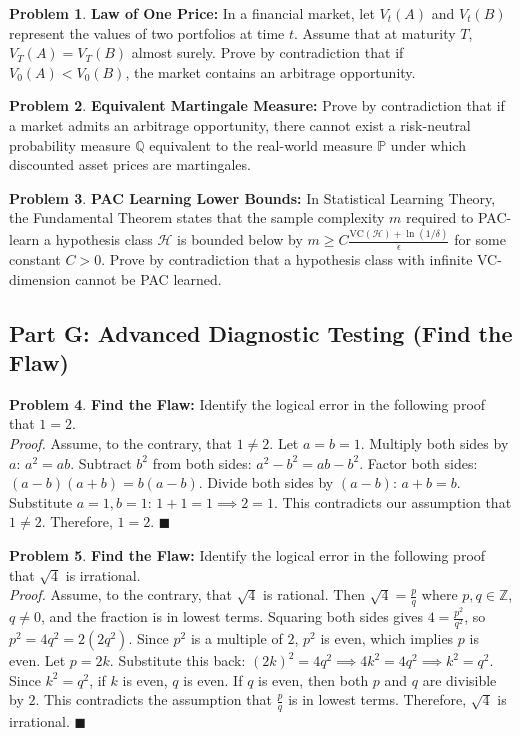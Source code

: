 \documentclass[11pt]{article}
\theoremstyle{definition}
\newtheorem{problem}{Problem}
\begin{document}
\begin{problem}
\textbf{Law of One Price:} In a financial market, let $V_t(A)$ and $V_t(B)$ represent the values of two portfolios at time $t$. Assume that at maturity $T$, $V_T(A) = V_T(B)$ almost surely. Prove by contradiction that if $V_0(A) < V_0(B)$, the market contains an arbitrage opportunity.
\end{problem}

\begin{problem}
\textbf{Equivalent Martingale Measure:} Prove by contradiction that if a market admits an arbitrage opportunity, there cannot exist a risk-neutral probability measure $\mathbb{Q}$ equivalent to the real-world measure $\mathbb{P}$ under which discounted asset prices are martingales.
\end{problem}

\begin{problem}
\textbf{PAC Learning Lower Bounds:} In Statistical Learning Theory, the Fundamental Theorem states that the sample complexity $m$ required to PAC-learn a hypothesis class $\mathcal{H}$ is bounded below by $m \ge C \frac{\text{VC}(\mathcal{H}) + \ln(1/\delta)}{\epsilon}$ for some constant $C > 0$. Prove by contradiction that a hypothesis class with infinite VC-dimension cannot be PAC learned.
\end{problem}

\subsection{Part G: Advanced Diagnostic Testing (Find the Flaw)}

\begin{problem}
\textbf{Find the Flaw:} Identify the logical error in the following proof that $1 = 2$. \\
\textit{Proof.} Assume, to the contrary, that $1 \neq 2$. Let $a = b = 1$. Multiply both sides by $a$: $a^2 = ab$. Subtract $b^2$ from both sides: $a^2 - b^2 = ab - b^2$. Factor both sides: $(a - b)(a + b) = b(a - b)$. Divide both sides by $(a - b)$: $a + b = b$. Substitute $a = 1, b = 1$: $1 + 1 = 1 \implies 2 = 1$. This contradicts our assumption that $1 \neq 2$. Therefore, $1 = 2$. $\blacksquare$
\end{problem}

\begin{problem}
\textbf{Find the Flaw:} Identify the logical error in the following proof that $\sqrt{4}$ is irrational. \\
\textit{Proof.} Assume, to the contrary, that $\sqrt{4}$ is rational. Then $\sqrt{4} = \frac{p}{q}$ where $p, q \in \mathbb{Z}$, $q \neq 0$, and the fraction is in lowest terms. Squaring both sides gives $4 = \frac{p^2}{q^2}$, so $p^2 = 4q^2 = 2(2q^2)$. Since $p^2$ is a multiple of $2$, $p^2$ is even, which implies $p$ is even. Let $p = 2k$. Substitute this back: $(2k)^2 = 4q^2 \implies 4k^2 = 4q^2 \implies k^2 = q^2$. Since $k^2 = q^2$, if $k$ is even, $q$ is even. If $q$ is even, then both $p$ and $q$ are divisible by $2$. This contradicts the assumption that $\frac{p}{q}$ is in lowest terms. Therefore, $\sqrt{4}$ is irrational. $\blacksquare$
\end{problem}
\end{document}
